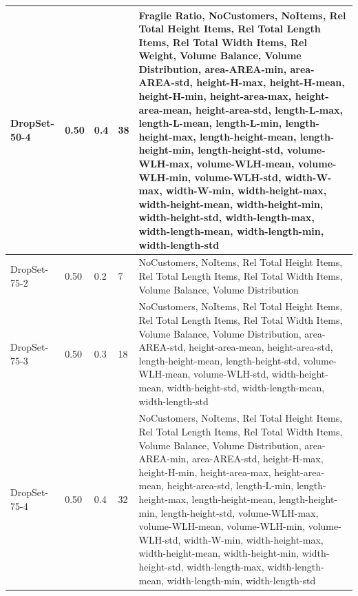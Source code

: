 \begin{table}[ht]
{\begin{tabular}{@{}P{0.045\paperheight}P{0.04\paperheight}P{0.07\paperheight}P{0.05\paperheight}P{0.47\paperheight}@{}}
            \midrule
            DropSet-50-4 & 0.50        & 0.4                             & 38              & Fragile Ratio, NoCustomers, NoItems, Rel Total Height Items, Rel Total Length Items, Rel Total Width Items, Rel Weight, Volume Balance, Volume Distribution, area-AREA-min, area-AREA-std, height-H-max, height-H-mean, height-H-min, height-area-max, height-area-mean, height-area-std, length-L-max, length-L-mean, length-L-min, length-height-max, length-height-mean, length-height-min, length-height-std, volume-WLH-max, volume-WLH-mean, volume-WLH-min, volume-WLH-std, width-W-max, width-W-min, width-height-max, width-height-mean, width-height-min, width-height-std, width-length-max, width-length-mean, width-length-min, width-length-std \\
            \midrule
            DropSet-75-2 & 0.50        & 0.2                             & 7               & NoCustomers, NoItems, Rel Total Height Items, Rel Total Length Items, Rel Total Width Items, Volume Balance, Volume Distribution                                                                                                                                                                                                                                                                                                                                                                                                                                                                                                                              \\
            \midrule
            DropSet-75-3 & 0.50        & 0.3                             & 18              & NoCustomers, NoItems, Rel Total Height Items, Rel Total Length Items, Rel Total Width Items, Volume Balance, Volume Distribution, area-AREA-std, height-area-mean, height-area-std, length-height-mean, length-height-std, volume-WLH-mean, volume-WLH-std, width-height-mean, width-height-std, width-length-mean, width-length-std                                                                                                                                                                                                                                                                                                                          \\
            \midrule
            DropSet-75-4 & 0.50        & 0.4                             & 32              & NoCustomers, NoItems, Rel Total Height Items, Rel Total Length Items, Rel Total Width Items, Volume Balance, Volume Distribution, area-AREA-min, area-AREA-std, height-H-max, height-H-min, height-area-max, height-area-mean, height-area-std, length-L-min, length-height-max, length-height-mean, length-height-min, length-height-std, volume-WLH-max, volume-WLH-mean, volume-WLH-min, volume-WLH-std, width-W-min, width-height-max, width-height-mean, width-height-min, width-height-std, width-length-max, width-length-mean, width-length-min, width-length-std                                                                                     \\


\end{tabular}}
\end{table}
